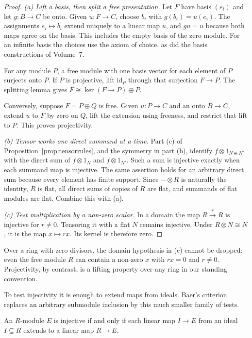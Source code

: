 \begin{proof}
\emph{(a) Lift a basis, then split a free presentation.} Let $F$ have basis $(e_i)$ and let $g\colon B\to C$ be onto. Given $u\colon F\to C$, choose $b_i$ with $g(b_i)=u(e_i)$. The assignments $e_i\mapsto b_i$ extend uniquely to a linear map $\tilde u$, and $g\tilde u=u$ because both maps agree on the basis. This includes the empty basis of the zero module. For an infinite basis the choices use the axiom of choice, as did the basis constructions of Volume~7.

For any module $P$, a free module with one basis vector for each element of $P$ surjects onto $P$. If $P$ is projective, lift $\mathrm{id}_P$ through that surjection $F\to P$. The splitting lemma gives $F\cong\ker(F\to P)\oplus P$.

Conversely, suppose $F=P\oplus Q$ is free. Given $u\colon P\to C$ and an onto $B\to C$, extend $u$ to $F$ by zero on $Q$, lift the extension using freeness, and restrict that lift to $P$. This proves projectivity.

\emph{(b) Tensor works one direct summand at a time.} Part (c) of Proposition~\ref{prop:tensorrules}, and the symmetry in part (b), identify $f\otimes1_{N\oplus N'}$ with the direct sum of $f\otimes1_N$ and $f\otimes1_{N'}$. Such a sum is injective exactly when each summand map is injective. The same assertion holds for an arbitrary direct sum because every element has finite support. Since $-\otimes R$ is naturally the identity, $R$ is flat, all direct sums of copies of $R$ are flat, and summands of flat modules are flat. Combine this with (a).

\emph{(c) Test multiplication by a non-zero scalar.} In a domain the map $R\xrightarrow{\,r\,}R$ is injective for $r\ne0$. Tensoring it with a flat $N$ remains injective. Under $R\otimes N\cong N$, it is the map $x\mapsto rx$. Its kernel is therefore zero.
\end{proof}

Over a ring with zero divisors, the domain hypothesis in (c) cannot be dropped: even the free module $R$ can contain a non-zero $x$ with $rx=0$ and $r\ne0$. Projectivity, by contrast, is a lifting property over any ring in our standing convention.

To test injectivity it is enough to extend maps from ideals. Baer's criterion replaces an arbitrary submodule inclusion by this much smaller family of tests.

\begin{theorem}\label{thm:baer}
An $R$-module $E$ is injective if and only if each linear map $I\to E$ from an ideal $I\subseteq R$ extends to a linear map $R\to E$.
\end{theorem}

